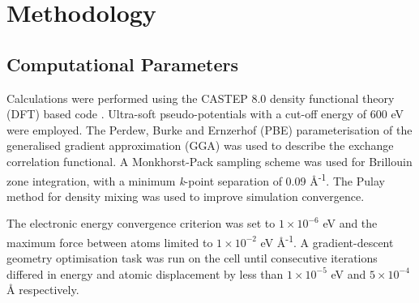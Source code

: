 
\section{\label{Method}Methodology}

\subsection{Computational Parameters}

Calculations were performed using the CASTEP 8.0 density functional theory (DFT) based code \cite{Clark2005}. Ultra-soft pseudo-potentials with a cut-off energy of 600 eV were employed. The Perdew, Burke and Ernzerhof (PBE) \cite{Perdew1996} parameterisation of the generalised gradient approximation (GGA) was used to describe the exchange correlation functional. A Monkhorst-Pack sampling scheme \cite{Monkhorst1976} was used for Brillouin zone integration, with a minimum \emph{k}-point separation of 0.09 \r{A}\textsuperscript{-1}. The Pulay method for density mixing \cite{Pulay1980} was used to improve simulation convergence. 

The electronic energy convergence criterion was set to $1\times10^{-6}$ eV and the maximum force between atoms limited to $1\times10^{-2}$ eV \r{A}\textsuperscript{-1}. A gradient-descent geometry optimisation task was run on the cell until consecutive iterations differed in energy and atomic displacement by less than $1\times10^{-5}$ eV and $5\times10^{-4}$ \r{A} respectively. 

